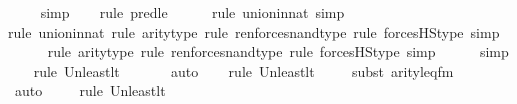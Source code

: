 \begin{isabellebody}
\ \ \ \isamarkupfalse%
\ simp\isanewline
\ \ \ \isamarkupfalse%
{\isacharparenleft}{\kern0pt}rule\ pred{\isacharunderscore}{\kern0pt}le{\isacharparenright}{\kern0pt}\isanewline
\ \ \ \ \ \isamarkupfalse%
{\isacharparenleft}{\kern0pt}rule\ union{\isacharunderscore}{\kern0pt}in{\isacharunderscore}{\kern0pt}nat{\isacharcomma}{\kern0pt}\ simp{\isacharparenright}{\kern0pt}{\isacharplus}{\kern0pt}\isanewline
\ \ \ \ \ \isamarkupfalse%
{\isacharparenleft}{\kern0pt}rule\ union{\isacharunderscore}{\kern0pt}in{\isacharunderscore}{\kern0pt}nat{\isacharcomma}{\kern0pt}\ rule\ arity{\isacharunderscore}{\kern0pt}type{\isacharcomma}{\kern0pt}\ rule\ ren{\isacharunderscore}{\kern0pt}forces{\isacharunderscore}{\kern0pt}nand{\isacharunderscore}{\kern0pt}type{\isacharcomma}{\kern0pt}\ rule\ forcesHS{\isacharprime}{\kern0pt}{\isacharunderscore}{\kern0pt}type{\isacharcomma}{\kern0pt}\ simp{\isacharparenright}{\kern0pt}\isanewline
\ \ \ \ \ \isamarkupfalse%
{\isacharparenleft}{\kern0pt}rule\ arity{\isacharunderscore}{\kern0pt}type{\isacharcomma}{\kern0pt}\ rule\ ren{\isacharunderscore}{\kern0pt}forces{\isacharunderscore}{\kern0pt}nand{\isacharunderscore}{\kern0pt}type{\isacharcomma}{\kern0pt}\ rule\ forcesHS{\isacharprime}{\kern0pt}{\isacharunderscore}{\kern0pt}type{\isacharcomma}{\kern0pt}\ simp{\isacharparenright}{\kern0pt}\isanewline
\ \ \ \ \isamarkupfalse%
\ simp\isanewline
\ \ \ \isamarkupfalse%
{\isacharparenleft}{\kern0pt}rule\ Un{\isacharunderscore}{\kern0pt}least{\isacharunderscore}{\kern0pt}lt{\isacharparenright}{\kern0pt}{\isacharplus}{\kern0pt}\isanewline
\ \ \ \ \ \isamarkupfalse%
\ auto{\isacharbrackleft}{\kern0pt}{}{\isacharbrackright}{\kern0pt}\isanewline
\ \ \ \isamarkupfalse%
{\isacharparenleft}{\kern0pt}rule\ Un{\isacharunderscore}{\kern0pt}least{\isacharunderscore}{\kern0pt}lt{\isacharparenright}{\kern0pt}{\isacharplus}{\kern0pt}\isanewline
\ \ \ \ \isamarkupfalse%
{\isacharparenleft}{\kern0pt}subst\ arity{\isacharunderscore}{\kern0pt}leq{\isacharunderscore}{\kern0pt}fm{\isacharparenright}{\kern0pt}\isanewline
\ \ \ \ \ \ \ \isamarkupfalse%
\ auto{\isacharbrackleft}{\kern0pt}{}{\isacharbrackright}{\kern0pt}\isanewline
\ \ \ \ \isamarkupfalse%
{\isacharparenleft}{\kern0pt}rule\ Un{\isacharunderscore}{\kern0pt}least{\isacharunderscore}{\kern0pt}lt{\isacharparenright}{\kern0pt}{\isacharplus}{\kern0pt}\isanewline
\ \ \ \ \ \ \isamarkupfalse%

\end{isabellebody}
